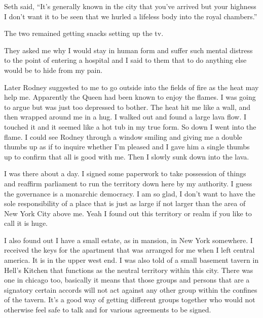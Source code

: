 Seth said, ``It's generally known in the city that you've arrived but your highness I don't want it to be seen that we hurled a lifeless body into the royal chambers.''

The two remained getting snacks setting up the tv.

They asked me why I would stay in human form and suffer such mental distress to the point of entering a hospital and I said to them that to do anything else would be to hide from my pain.

Later Rodney suggested to me to go outside into the fields of fire as the heat may help me. Apparently the Queen had been known to enjoy the flames. I was going to argue but was just too depressed to bother. The heat hit me like a wall, and then wrapped around me in a hug. I walked out and found a large lava flow. I touched it and it seemed like a hot tub in my true form. So down I went into the flame. I could see Rodney through a window smiling and giving me a double thumbs up as if to inquire whether I’m pleased and I gave him a single thumbs up to confirm that all is good with me. Then I slowly sunk down into the lava.

I was there about a day. I signed some paperwork to take possession of things and reaffirm parliament to run the territory down here by my authority. I guess the governance is a monarchic democracy. I am so glad, I don’t want to have the sole responsibility of a place that is just as large if not larger than the area of New York City above me. Yeah I found out this territory or realm if you like to call it is huge.

I also found out I have a small estate, as in mansion, in New York somewhere. I received the keys for the apartment that was arranged for me when I left central america. It is in the upper west end. I was also told of a small basement tavern in Hell’s Kitchen that functions as the neutral territory within this city. There was one in chicago too, basically it means that those groups and persons that are a signatory certain accords will not act against any other group within the confines of the tavern. It’s a good way of getting different groups together who would not otherwise feel safe to talk and for various agreements to be signed.

\parasep{}









 